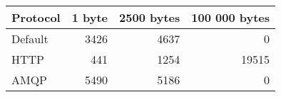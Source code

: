 \begin{tabularx}{\textwidth}{lrrr}
\hline
 Protocol   &   1 byte &   2500 bytes &   100 000 bytes \\
\hline
 Default    &     3426 &         4637 &               0 \\
 HTTP       &      441 &         1254 &           19515 \\
 AMQP       &     5490 &         5186 &               0 \\
\hline
\end{tabularx}